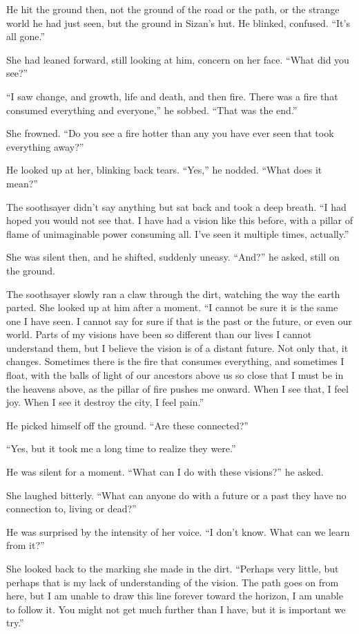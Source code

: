He hit the ground then, not the ground of the road or the path, or the strange world he had just seen, but the ground in Sizan's hut. He blinked, confused. ``It's all gone.''

She had leaned forward, still looking at him, concern on her face. ``What did you see?''

``I saw change, and growth, life and death, and then fire. There was a fire that consumed everything and everyone,'' he sobbed. ``That was the end.''

She frowned. ``Do you see a fire hotter than any you have ever seen that took everything away?''

He looked up at her, blinking back tears. ``Yes,'' he nodded. ``What does it mean?''

The soothsayer didn't say anything but sat back and took a deep breath. ``I had hoped you would not see that. I have had a vision like this before, with a pillar of flame of unimaginable power consuming all. I've seen it multiple times, actually.''

She was silent then, and he shifted, suddenly uneasy. ``And?'' he asked, still on the ground.

The soothsayer slowly ran a claw through the dirt, watching the way the earth parted. She looked up at him after a moment. ``I cannot be sure it is the same one I have seen. I cannot say for sure if that is the past or the future, or even our world. Parts of my visions have been so different than our lives I cannot understand them, but I believe the vision is of a distant future. Not only that, it changes. Sometimes there is the fire that consumes everything, and sometimes I float, with the balls of light of our ancestors above us so close that I must be in the heavens above, as the pillar of fire pushes me onward. When I see that, I feel joy. When I see it destroy the city, I feel pain.''

He picked himself off the ground. ``Are these connected?''

``Yes, but it took me a long time to realize they were.''

He was silent for a moment. ``What can I do with these visions?'' he asked.

She laughed bitterly. ``What can anyone do with a future or a past they have no connection to, living or dead?''

He was surprised by the intensity of her voice. ``I don't know. What can we learn from it?''

She looked back to the marking she made in the dirt. ``Perhaps very little, but perhaps that is my lack of understanding of the vision. The path goes on from here, but I am unable to draw this line forever toward the horizon, I am unable to follow it. You might not get much further than I have, but it is important we try.''


